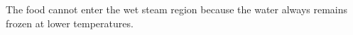 The food cannot enter the wet steam region because the water always remains frozen at lower temperatures.